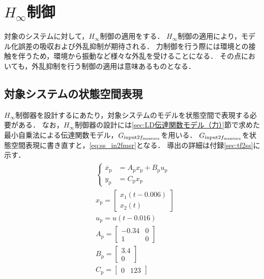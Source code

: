 \section{$H_\infty$制御}
対象のシステムに対して，$H_\infty$制御の適用をする．
$H_\infty$制御の適用により，モデル化誤差の吸収および外乱抑制が期待される\cite{三平満司1997実用的な,平田201703}．
力制御を行う際には環境との接触を伴うため，環境から振動など様々な外乱を受けることになる．
その点においても，外乱抑制を行う制御の適用は意味あるものとなる．
\subsection{対象システムの状態空間表現}
$H_\infty$制御器を設計するにあたり，対象システムのモデルを状態空間で表現する必要がある．
なお，$H_\infty$制御器の設計には\ref{sec:LD伝達関数モデル（力）}節で求めた最小自乗法による伝達関数モデル，$G_{\mathrm{input}2f_\mathrm{measure}}$を用いる．
$G_{\mathrm{input}2f_\mathrm{measure}}$を状態空間表現に書き直すと，\eqnname\ref{eq:ss_in2fmsr}となる．
導出の詳細は付録\ref{sec:tf2ss}に示す．
\begin{align}
    \label{eq:ss_in2fmsr}
    \begin{split}
        &\begin{cases}
            \dot{x_\mathrm{p}}
            &=A_\mathrm{p}x_\mathrm{p}
            +B_\mathrm{p}
            u_\mathrm{p} \\[10pt]
            y_\mathrm{p} &=
            C_\mathrm{p}x_\mathrm{p}
        \end{cases}\\[10pt]
        &x_\mathrm{p} = 
        \begin{bmatrix}
            x_1(t-0.006)\\
            x_2(t)
        \end{bmatrix}\\
        &u_\mathrm{p} = u(t-0.016)\\
        &A_\mathrm{p} = 
        \begin{bmatrix}
            -0.34 & 0\\
            1 & 0
        \end{bmatrix}\\
        &B_\mathrm{p} = 		
        \begin{bmatrix}
            3.4\\
            0
        \end{bmatrix}\\
        &C_\mathrm{p} = 
        \begin{bmatrix}	
            0 & 123
        \end{bmatrix}
    \end{split}
\end{align}

